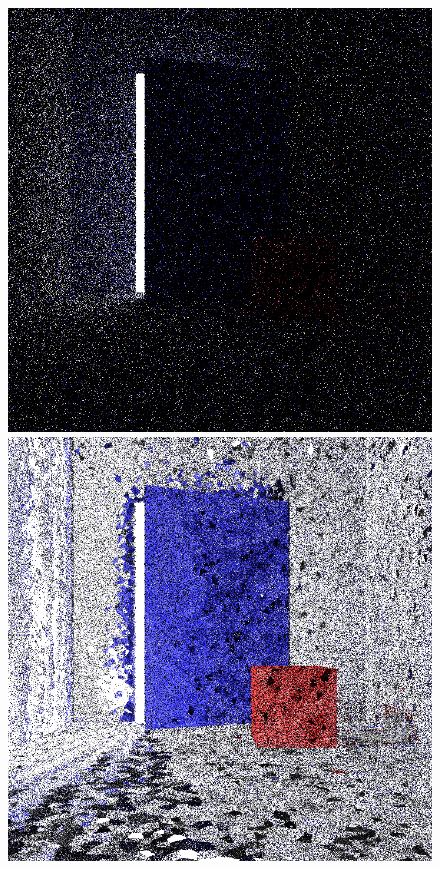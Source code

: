 \documentclass[../dissertation.tex]{subfiles}
\begin{document}
\begin{figure}[h]
\centering
{}
  \includegraphics[width=\textwidth]{images/renders/max_dir/1_spp_default.png}   
  \label{fig:default_1_spp}
\endminipage\hspace{0.1em}
  \includegraphics[width=\textwidth]{images/renders/max_dir/1_spp_sarsa_max_dir.png}   

\end{figure}
\end{document}
